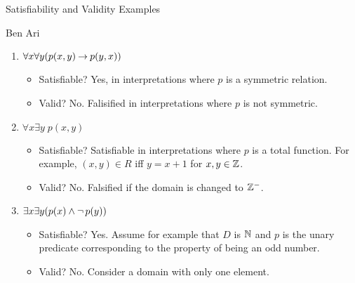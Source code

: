 \documentclass[style=sailor,size=12pt]{powerdot}
\begin{document}
\begin{wideslide}[bm=,toc=]{Satisfiability and Validity Examples}
\begin{defn}{7.25}{Ben Ari}
\end{defn}
\begin{enumerate}
\item<2-> $\forall x \forall y (p(x,y) \mathbin{\rightarrow} p(y,x))$
\begin{itemize}
\item<3-> Satisfiable? \pause[3] Yes, in interpretations where $p$ is a
symmetric relation.
\item<3-> Valid? \pause No. Falisified in interpretations where $p$ is
not symmetric. 
\end{itemize}
\item<6-> $\forall x \exists y \; p(x,y)$
\begin{itemize}
\item<7-> Satisfiable? \pause[3] Satisfiable in interpretations where 
$p$ is a total function. For example, $(x,y) \in R$ iff $y = x + 1$
for $x,y \in \mathbb{Z}$.
\item<7-> Valid? \pause No. Falsified if the domain is changed to $\mathbb{Z}^-$.  
\end{itemize}
\item<10-> $\exists x \exists y(p(x) \land \mathop{\neg} p (y))$
\begin{itemize}
\item<11-> Satisfiable? \pause[3] Yes. Assume for example that $D$ is $\mathbb{N}$ and
$p$ is the unary predicate corresponding to the property of being an
odd number.
\item<11-> Valid? \pause No. Consider a domain with only one element.
\end{itemize}
\end{enumerate}
\end{wideslide}
\end{document}
